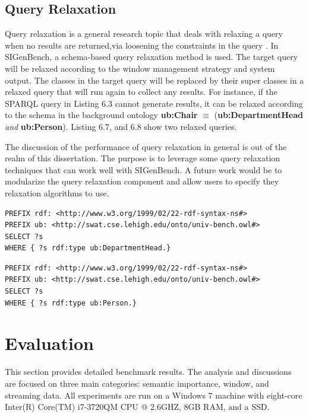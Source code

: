 \subsection{Query Relaxation}
Query relaxation is a general research topic that deals with relaxing a query when no results are returned,via loosening the constraints in the query \cite{hurtado2008query} \cite{reddy2010efficient} \cite{viswanathan2016pragmatic}.
In SIGenBench, a schema-based query relaxation method is used.
The target query will be relaxed according to the window management strategy and system output.
The classes in the target query will be replaced by their super classes in a relaxed query that will run again to collect any results. 
For instance, if the SPARQL query in Listing 6.3 cannot generate results, it can be relaxed according to the schema in the background ontology \textbf{ub:Chair} $\equiv$ (\textbf{ub:DepartmentHead} \textit{and} \textbf{ub:Person}).
Listing 6.7, and 6.8 show two relaxed queries.

The discussion of the performance of query relaxation in general is out of the realm of this dissertation. 
The purpose is to leverage some query relaxation techniques that can work well with SIGenBench. 
A future work would be to modularize the query relaxation component and allow users to specify they relaxation algorithms to use.

\begin{lstlisting}[language=SPARQL, caption={Relaxed Query 1},basicstyle=\small,frame=single]
PREFIX rdf: <http://www.w3.org/1999/02/22-rdf-syntax-ns#>
PREFIX ub: <http://swat.cse.lehigh.edu/onto/univ-bench.owl#>
SELECT ?s
WHERE {	?s rdf:type ub:DepartmentHead.}
\end{lstlisting}

\begin{lstlisting}[language=SPARQL, caption={Relaxed Query 2},basicstyle=\small,frame=single]
PREFIX rdf: <http://www.w3.org/1999/02/22-rdf-syntax-ns#>
PREFIX ub: <http://swat.cse.lehigh.edu/onto/univ-bench.owl#>
SELECT ?s
WHERE {	?s rdf:type ub:Person.}
\end{lstlisting}
%
\section{Evaluation}
This section provides detailed benchmark results.
The analysis and discussions are focused on three main categories: semantic importance, window, and streaming data.
All experiments are run on a Windows 7 machine with eight-core Inter(R) Core(TM) i7-3720QM CPU @ 2.6GHZ, 8GB RAM, and a SSD. 
%
